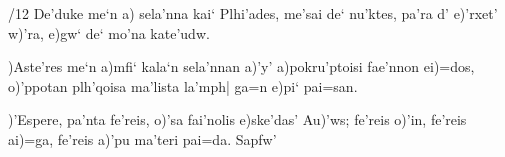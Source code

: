 \hsize 4in

/12
\GK
\obeylines
De'duke me`n a) sela'nna
kai` Plhi'ades, me'sai de`
nu'ktes, pa'ra d' e)'rxet' w)'ra,
e)gw` de` mo'na kate'udw.

\medskip

)Aste'res me`n a)mfi` kala`n sela'nnan
a)'y' a)pokru'ptoisi fae'nnon ei)=dos,
o)'ppotan plh'qoisa ma'lista la'mph|
ga=n e)pi` pai=san.

\medskip

)'Espere, pa'nta fe'reis, o)'sa fai'nolis e)ske'das' Au)'ws;
fe'reis o)'in,
fe'reis ai)=ga,
fe'reis a)'pu ma'teri pai=da.
\hfill Sapfw'
\RM
\bye
